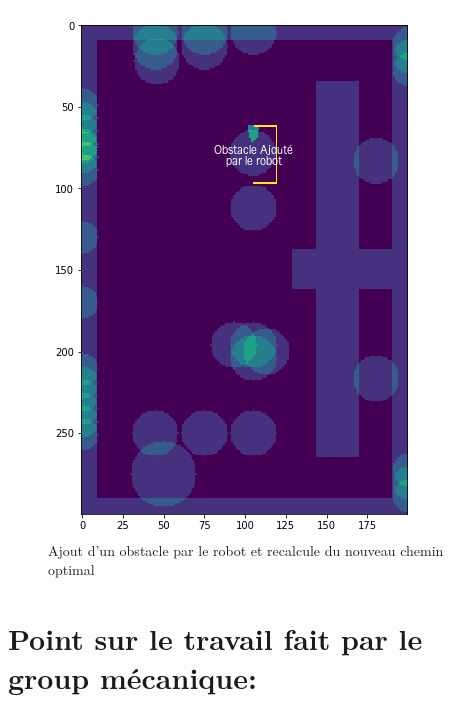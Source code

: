 \documentclass{article}
\begin{document}
\begin{figure}[!h]
\centering
\includegraphics[scale=0.6]{obstacle}
\caption{Ajout d'un obstacle par le robot et recalcule du nouveau chemin optimal}
\label{fig:obstacle}
\end{figure}

\section{Point sur le travail fait par le group mécanique:}



\end{document}
